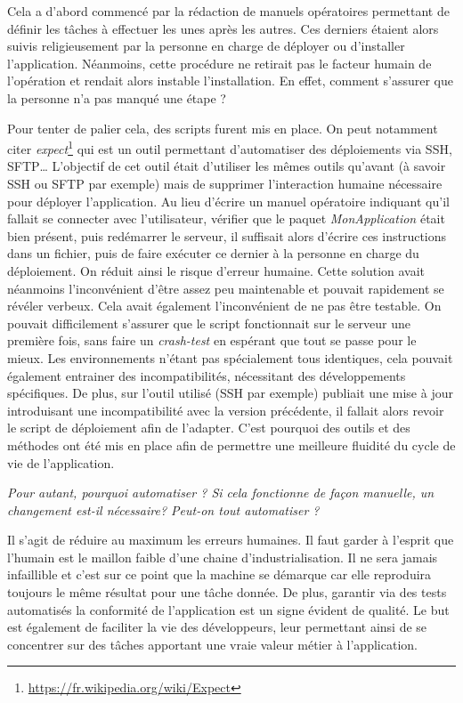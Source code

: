 Cela a d'abord commencé par la rédaction de manuels opératoires permettant de définir les tâches à effectuer les unes après les autres. Ces derniers étaient alors suivis religieusement par la personne en charge de déployer ou d'installer l'application. Néanmoins, cette procédure ne retirait pas le facteur humain de l'opération et rendait alors instable l'installation. En effet, comment s'assurer que la personne n'a pas manqué une étape ? 

Pour tenter de palier cela, des scripts furent mis en place. On peut notamment citer \emph{expect}\footnote{\url{https://fr.wikipedia.org/wiki/Expect}} qui est un outil permettant d'automatiser des déploiements via \gls{SSH}, \gls{SFTP}\ldots{} L'objectif de cet outil était d'utiliser les mêmes outils qu'avant (à savoir \gls{SSH} ou \gls{SFTP} par exemple) mais de supprimer l'interaction humaine nécessaire pour déployer l'application. Au lieu d'écrire un manuel opératoire indiquant qu'il fallait se connecter avec l'utilisateur, vérifier que le paquet \emph{MonApplication} était bien présent, puis redémarrer le serveur, il suffisait alors d'écrire ces instructions dans un fichier, puis de faire exécuter ce dernier à la personne en charge du déploiement. On réduit ainsi le risque d'erreur humaine. Cette solution avait néanmoins l'inconvénient d'être assez peu maintenable et pouvait rapidement se révéler verbeux. Cela avait également l'inconvénient de ne pas être testable. On pouvait difficilement s'assurer que le script fonctionnait sur le serveur une première fois, sans faire un \emph{crash-test} en espérant que tout se passe pour le mieux. Les environnements n'étant pas spécialement tous identiques, cela pouvait également entrainer des incompatibilités, nécessitant des développements spécifiques. De plus, sur l'outil utilisé (\gls{SSH} par exemple) publiait une mise à jour introduisant une incompatibilité avec la version précédente, il fallait alors revoir le script de déploiement afin de l'adapter. C'est pourquoi des outils et des méthodes ont été mis en place afin de permettre une meilleure fluidité du cycle de vie de l'application. 

\emph{Pour autant, pourquoi automatiser ? Si cela fonctionne de façon manuelle, un changement est-il nécessaire? Peut-on tout automatiser ?}

Il s'agit de réduire au maximum les erreurs humaines. Il faut garder à l'esprit que l'humain est le maillon faible d'une chaine d'industrialisation. Il ne sera jamais infaillible et c'est sur ce point que la machine se démarque car elle reproduira toujours le même résultat pour une tâche donnée. De plus, garantir via des tests automatisés la conformité de l'application est un signe évident de qualité. Le but est également de faciliter la vie des développeurs, leur permettant ainsi de se concentrer sur des tâches apportant une vraie valeur métier à l'application.

